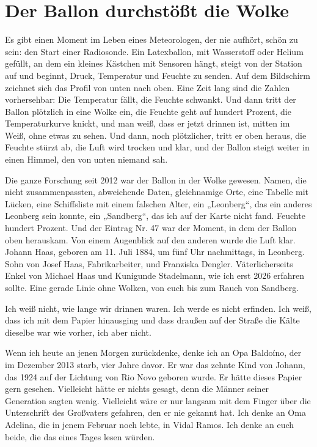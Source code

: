 \documentclass[
  ngerman,
  11pt,
  openany]{book}
\begin{document}
\section{Der Ballon durchstößt die
Wolke}\label{der-ballon-durchstuxf6uxdft-die-wolke}

Es gibt einen Moment im Leben eines Meteorologen, der nie aufhört, schön
zu sein: den Start einer Radiosonde. Ein Latexballon, mit Wasserstoff
oder Helium gefüllt, an dem ein kleines Kästchen mit Sensoren hängt,
steigt von der Station auf und beginnt, Druck, Temperatur und Feuchte zu
senden. Auf dem Bildschirm zeichnet sich das Profil von unten nach oben.
Eine Zeit lang sind die Zahlen vorhersehbar: Die Temperatur fällt, die
Feuchte schwankt. Und dann tritt der Ballon plötzlich in eine Wolke ein,
die Feuchte geht auf hundert Prozent, die Temperaturkurve knickt, und
man weiß, dass er jetzt drinnen ist, mitten im Weiß, ohne etwas zu
sehen. Und dann, noch plötzlicher, tritt er oben heraus, die Feuchte
stürzt ab, die Luft wird trocken und klar, und der Ballon steigt weiter
in einen Himmel, den von unten niemand sah.

Die ganze Forschung seit 2012 war der Ballon in der Wolke gewesen.
Namen, die nicht zusammenpassten, abweichende Daten, gleichnamige Orte,
eine Tabelle mit Lücken, eine Schiffsliste mit einem falschen Alter, ein
„Leonberg``, das ein anderes Leonberg sein konnte, ein „Sandberg``, das
ich auf der Karte nicht fand. Feuchte hundert Prozent. Und der Eintrag
Nr. 47 war der Moment, in dem der Ballon oben herauskam. Von einem
Augenblick auf den anderen wurde die Luft klar. Johann Haas, geboren am
11. Juli 1884, um fünf Uhr nachmittags, in Leonberg. Sohn von Josef
Haas, Fabrikarbeiter, und Franziska Dengler. Väterlicherseits Enkel von
Michael Haas und Kunigunde Stadelmann, wie ich erst 2026 erfahren
sollte. Eine gerade Linie ohne Wolken, von euch bis zum Rauch von
Sandberg.

Ich weiß nicht, wie lange wir drinnen waren. Ich werde es nicht
erfinden. Ich weiß, dass ich mit dem Papier hinausging und dass draußen
auf der Straße die Kälte dieselbe war wie vorher, ich aber nicht.

Wenn ich heute an jenen Morgen zurückdenke, denke ich an Opa Baldoíno,
der im Dezember 2013 starb, vier Jahre davor. Er war das zehnte Kind von
Johann, das 1924 auf der Lichtung von Rio Novo geboren wurde. Er hätte
dieses Papier gern gesehen. Vielleicht hätte er nichts gesagt, denn die
Männer seiner Generation sagten wenig. Vielleicht wäre er nur langsam
mit dem Finger über die Unterschrift des Großvaters gefahren, den er nie
gekannt hat. Ich denke an Oma Adelina, die in jenem Februar noch lebte,
in Vidal Ramos. Ich denke an euch beide, die das eines Tages lesen
würden.
\end{document}

